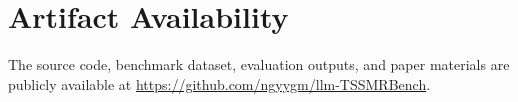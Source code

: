 \section*{Artifact Availability}

The source code, benchmark dataset, evaluation outputs, and paper materials are publicly available at \url{https://github.com/ngyygm/llm-TSSMRBench}.
